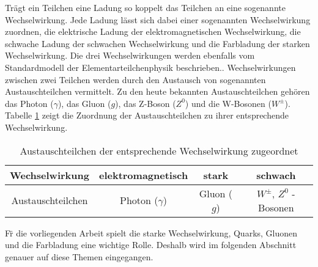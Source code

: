 Tr\"agt ein Teilchen eine Ladung so koppelt das Teilchen an eine sogenannte Wechselwirkung.
Jede Ladung l\"asst sich dabei einer sogenannten Wechselwirkung zuordnen,
die elektrische Ladung der elektromagnetischen Wechselwirkung, die schwache Ladung der schwachen Wechselwirkung und die Farbladung der starken Wechselwirkung.
Die drei Wechselwirkungen werden ebenfalls vom Standardmodell der Elementarteilchenphysik beschrieben..
\newline
Wechselwirkungen zwischen zwei Teilchen werden durch den Austausch von sogenannten Austauschteilchen vermittelt.
Zu den heute bekannten Austauschteilchen geh\"oren das Photon ($\gamma$), das Gluon ($g$), das Z-Boson ($Z^{0}$) und die W-Bosonen ($W^{\pm}$).
Tabelle \ref{tab:Austeilchen} zeigt die Zuordnung der Austauschteilchen zu ihrer entsprechende Wechselwirkung.
\begin{table}[h]
\centering
\begin{tabular}{|c||c|c|c|}
\hline
Wechselwirkung    & elektromagnetisch & stark       & schwach                      \\ \hline
Austauschteilchen & Photon ($\gamma$) & Gluon ($g$) & $W^{\pm}$, $Z^{0}$ - Bosonen \\ \hline
\end{tabular}
\caption{Austauschteilchen der entsprechende Wechselwirkung zugeordnet}
\label{tab:Austeilchen}
\end{table}
\newline
F\"r die vorliegenden Arbeit spielt die starke Wechselwirkung, Quarks, Gluonen und die Farbladung eine wichtige Rolle.
Deshalb wird im folgenden Abschnitt genauer auf diese Themen eingegangen.